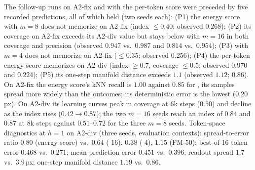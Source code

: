 The follow-up runs on A2-fix and with the per-token score were preceded by five recorded predictions, all of which held (two seeds each): (P1) the energy score with $m{=}8$ does not memorize on A2-fix (index $\le 0.40$; observed $0.268$); (P2) its coverage on A2-fix exceeds its A2-div value but stays below \imlewm{} with $m{=}16$ in both coverage and precision (observed $0.947$ vs.\ $0.987$ and $0.814$ vs.\ $0.954$); (P3) \imlewm{} with $m{=}4$ does not memorize on A2-fix ($\le 0.35$; observed $0.256$); (P4) the per-token energy score memorizes on A2-div (index $\ge 0.7$, coverage $\le 0.5$; observed $0.970$ and $0.224$); (P5) its one-step manifold distance exceeds $1.1$ (observed $1.12$; \imlewm{} $0.86$). On A2-fix the energy score's kNN recall is $1.00$ against $0.85$ for \imlewm{}, its samples spread more widely than the outcomes; its deterministic error is the lowest ($0.20$\,px). On A2-div its learning curves peak in coverage at 6k steps ($0.50$) and decline as the index rises ($0.42 \to 0.87$); the two $m{=}16$ seeds reach an index of $0.84$ and $0.87$ at 8k steps against $0.51$--$0.72$ for the three $m{=}8$ seeds. Token-space diagnostics at $h{=}1$ on A2-div (three seeds, evaluation contexts): spread-to-error ratio $0.80$ (energy score) vs.\ $0.64$ (\imlewm{} 16), $0.38$ (\imlewm{} 4), $1.15$ (FM-50); best-of-16 token error $0.468$ vs.\ $0.271$; mean-prediction error $0.451$ vs.\ $0.396$; readout spread $1.7$ vs.\ $3.9$\,px; one-step manifold distance $1.19$ vs.\ $0.86$.


